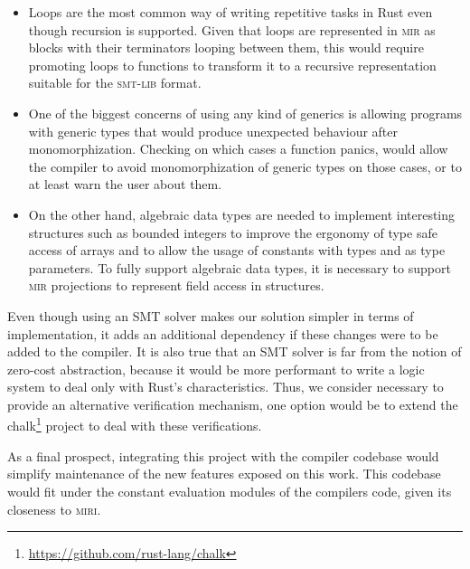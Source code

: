 \begin{itemize}

    \item Loops are the most common way of writing repetitive tasks in Rust
        even though recursion is supported. Given that loops are represented in
        \textsc{mir} as blocks with their terminators looping between them,
        this would require promoting loops to functions to transform it to a
        recursive representation suitable for the \textsc{smt-lib} format.         

    \item One of the biggest concerns of using any kind of generics is allowing
        programs with generic types that would produce unexpected behaviour after
        monomorphization. Checking on which cases a function panics, would allow
        the compiler to avoid monomorphization of generic types on those cases, or
        to at least warn the user about them.

    \item On the other hand, algebraic data types are needed to implement
        interesting structures such as bounded integers to improve the ergonomy
        of type safe access of arrays and to allow the usage of constants with
        types  and  as type parameters.
        To fully support algebraic data types, it is necessary to support
        \textsc{mir} projections to represent field access in structures.

\end{itemize}

Even though using an SMT solver makes our solution simpler in terms of
implementation, it adds an additional dependency if these changes were to be
added to the compiler. It is also true that an SMT solver is far from the
notion of zero-cost abstraction, because it would be more performant to write a
logic system to deal only with Rust's characteristics. Thus, we consider
necessary to provide an alternative verification mechanism, one option would be
to extend the chalk\footnote{\url{https://github.com/rust-lang/chalk}} project
to deal with these verifications.

As a final prospect, integrating this project with the compiler codebase would
simplify maintenance of the new features exposed on this work. This codebase
would fit under the constant evaluation modules of the compilers code, given
its closeness to \textsc{miri}.
